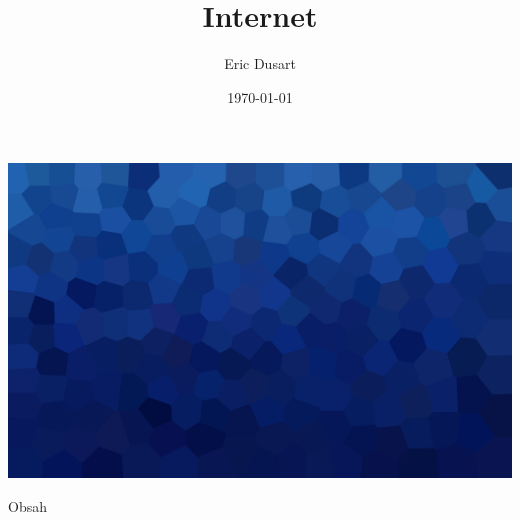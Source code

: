 \documentclass[aspectratio=169,xcolor=dvipsnames, t]{beamer}
\title[]{Internet} %
\subtitle{}
\author[Dusart]{Eric Dusart}
\institute[GEVO]{Gymnázium Evolution Jižní Město}
\date{\today}
\begin{document}
\maketitlepage
{
{
    \includegraphics[width=\paperwidth,height=\paperheight]{AICStyleData/logos/mene_polygonu_bg.png}
}
\begin{frame}[t]{Obsah}
    \tableofcontents
\end{frame}
}
\end{document}
